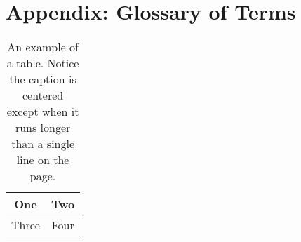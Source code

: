 \chapter{Appendix: Glossary of Terms}
%

\begin{table}[tbh]
\renewcommand{\arraystretch}{1.3}
\centering
\begin{tabular}{|c||c|}
\hline
One & Two\\
\hline
Three & Four\\
\hline
\end{tabular}
\caption[Example table]{An example of a table. Notice the caption is centered except when it runs longer than a single line on the page.}
\label{tab.example_1}
\end{table}
